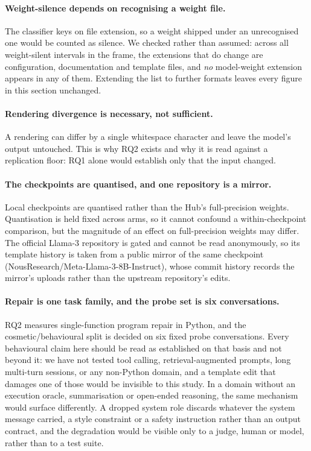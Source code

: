 \paragraph{Weight-silence depends on recognising a weight file.} The classifier keys on file
extension, so a weight shipped under an unrecognised one would be counted as silence. We checked
rather than assumed: across all weight-silent intervals in the frame, the extensions that do change
are configuration, documentation and template files, and \emph{no} model-weight extension appears
in any of them. Extending the list to further formats leaves every figure in this section unchanged.

\paragraph{Rendering divergence is necessary, not sufficient.} A rendering can differ by a single
whitespace character and leave the model's output untouched. This is why RQ2 exists and why it is
read against a replication floor: RQ1 alone would establish only that the input changed.

\paragraph{The checkpoints are quantised, and one repository is a mirror.} Local checkpoints are
quantised rather than the Hub's full-precision weights. Quantisation is held fixed across arms, so it
cannot confound a within-checkpoint comparison, but the magnitude of an effect on full-precision
weights may differ. The official Llama-3 repository is gated and cannot be read anonymously, so its
template history is taken from a public mirror of the same checkpoint
(NousResearch/Meta-Llama-3-8B-Instruct), whose commit history records the mirror's uploads rather
than the upstream repository's edits.

\paragraph{Repair is one task family, and the probe set is six conversations.} RQ2 measures
single-function program repair in Python, and the cosmetic/behavioural split is decided on six fixed
probe conversations. Every behavioural claim here should be read as established on that basis and
not beyond it: we have not tested tool calling, retrieval-augmented prompts, long multi-turn
sessions, or any non-Python domain, and a template edit that damages one of those would be invisible
to this study. In a domain without an execution oracle, summarisation or open-ended reasoning, the
same mechanism would surface differently. A dropped system role discards whatever the system message
carried, a style constraint or a safety instruction rather than an output contract, and the
degradation would be visible only to a judge, human or model, rather than to a test suite.

